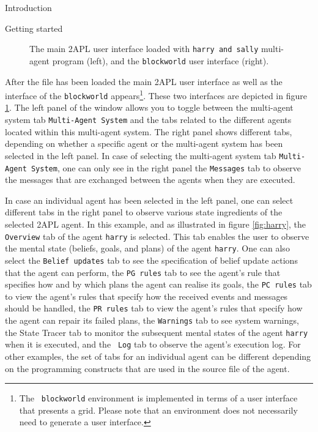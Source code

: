 \begin{chapter}{Introduction}
\begin{section}{Getting started}
\begin{figure}
    \begin{minipage}{0.6\linewidth}
        \begin{center}
        \end{center}
    \end{minipage}
    \hspace{.5cm}
    \begin{minipage}{0.3\linewidth}
        \begin{center}
        \end{center}
    \end{minipage}
    \caption{The main 2APL user interface loaded with {\tt harry and sally} multi-agent program (left), and the {\tt blockworld} user interface (right).}\label{fig:loadedmas}
\end{figure}

After the file has been loaded the main 2APL user interface as well
as the interface of the {\tt blockworld} appears\footnote{The {\tt
blockworld} environment is implemented in terms of a user interface
that presents a grid. Please note that an environment does not
necessarily need to generate a user interface.}. These two
interfaces are depicted in figure \ref{fig:loadedmas}. The left
panel of the window allows you to toggle between the multi-agent
system tab {\tt Multi-Agent System} and the tabs related to the
different agents located within this multi-agent system. The right
panel shows different tabs, depending on whether a specific agent or
the multi-agent system has been selected in the left panel. In case
of selecting the multi-agent system tab {\tt Multi-Agent System},
one can only see in the right panel the {\tt Messages} tab to
observe the messages that are exchanged between the agents when they
are executed.

In case an individual agent has been selected in the left panel, one
can select different tabs in the right panel to observe various
state ingredients of the selected 2APL agent. In this example, and
as illustrated in figure \ref{fig:harry}, the {\tt Overview} tab of
the agent {\tt harry} is selected. This tab enables the user to
observe the mental state (beliefs, goals, and plans) of the agent
{\tt harry}. One can also select the {\tt Belief updates} tab to see
the specification of belief update actions that the agent can
perform, the {\tt PG rules} tab to see the agent's rule that
specifies how and by which plans the agent can realise its goals,
the {\tt PC rules} tab to view the agent's rules that specify how
the received events and messages should be handled, the {\tt PR
rules} tab to view the agent's rules that specify how the agent can
repair its failed plans, the {\tt Warnings} tab to see system
warnings, the {State Tracer} tab to monitor the subsequent mental
states of the agent {\tt harry} when it is executed, and the {\tt
Log} tab to observe the agent's execution log. For other examples,
the set of tabs for an individual agent can be different depending
on the programming constructs that are used in the source file of
the agent.


\end{section}
\end{chapter}
